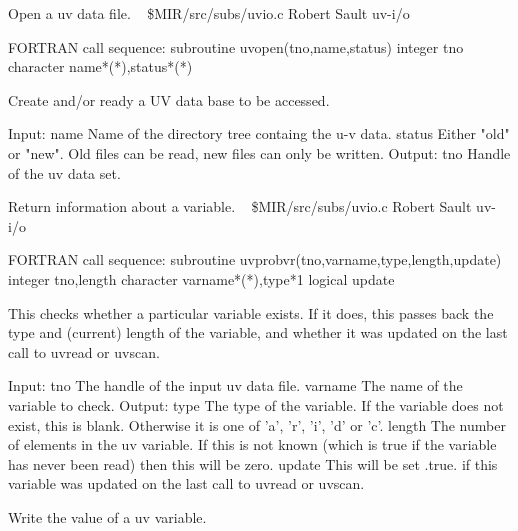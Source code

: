 %
\noindent Open a uv data file.
\newline \ 
\newline {} \$MIR/src/subs/uvio.c
\newline {} Robert Sault
\newline {} uv-i/o
\par{\tenpoint
{\eightpoint\begintt
FORTRAN call sequence:
        subroutine uvopen(tno,name,status)
        integer tno
        character name*(*),status*(*)

  Create and/or ready a UV data base to be accessed.

  Input:
    name        Name of the directory tree containg the u-v data.
    status      Either "old" or "new". Old files can be read, new
                files can only be written.
  Output:
    tno         Handle of the uv data set.                              
\endtt}
\par}
%
\noindent Return information about a variable.
\newline \ 
\newline {} \$MIR/src/subs/uvio.c
\newline {} Robert Sault
\newline \abox{Keywords:} uv-i/o
\par{\tenpoint
{\eightpoint\begintt
FORTRAN call sequence:
        subroutine uvprobvr(tno,varname,type,length,update)
        integer tno,length
        character varname*(*),type*1
        logical update

  This checks whether a particular variable exists. If it does, this
  passes back the type and (current) length of the variable, and whether
  it was updated on the last call to uvread or uvscan.

  Input:
    tno         The handle of the input uv data file.
    varname     The name of the variable to check.
  Output:
    type        The type of the variable. If the variable does not
                exist, this is blank. Otherwise it is one of 'a', 'r',
                'i', 'd' or 'c'.
    length      The number of elements in the uv variable. If this is not
                known (which is true if the variable has never been read)
                then this will be zero.
    update      This will be set .true. if this variable was updated
                on the last call to uvread or uvscan.                   
\endtt}
\par}
%
\noindent Write the value of a uv variable.
